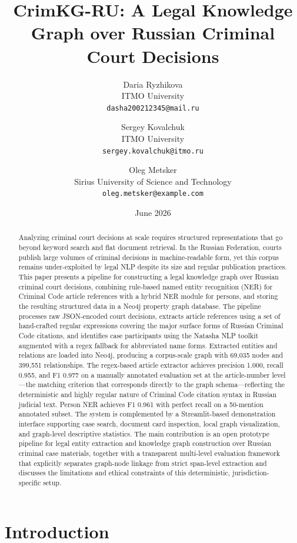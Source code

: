 \documentclass[11pt]{article}
\title{CrimKG-RU: A Legal Knowledge Graph over Russian Criminal Court Decisions}
\author{
  Daria Ryzhikova \\ ITMO University \\ \texttt{dasha200212345@mail.ru}
  \and
  Sergey Kovalchuk \\ ITMO University \\ \texttt{sergey.kovalchuk@itmo.ru}
  \and
  Oleg Metsker \\ Sirius University of Science and Technology \\ \texttt{oleg.metsker@example.com}
}
\date{June 2026}
\begin{document}
\maketitle

\begin{abstract}
Analyzing criminal court decisions at scale requires structured representations that go beyond keyword search and flat document retrieval. In the Russian Federation, courts publish large volumes of criminal decisions in machine-readable form, yet this corpus remains under-exploited by legal NLP despite its size and regular publication practices. This paper presents a pipeline for constructing a legal knowledge graph over Russian criminal court decisions, combining rule-based named entity recognition (NER) for Criminal Code article references with a hybrid NER module for persons, and storing the resulting structured data in a Neo4j property graph database. The pipeline processes raw JSON-encoded court decisions, extracts article references using a set of hand-crafted regular expressions covering the major surface forms of Russian Criminal Code citations, and identifies case participants using the Natasha NLP toolkit augmented with a regex fallback for abbreviated name forms. Extracted entities and relations are loaded into Neo4j, producing a corpus-scale graph with 69{,}035 nodes and 399{,}551 relationships. The regex-based article extractor achieves precision 1.000, recall 0.955, and F1 0.977 on a manually annotated evaluation set at the article-number level—the matching criterion that corresponds directly to the graph schema—reflecting the deterministic and highly regular nature of Criminal Code citation syntax in Russian judicial text. Person NER achieves F1 0.961 with perfect recall on a 50-mention annotated subset. The system is complemented by a Streamlit-based demonstration interface supporting case search, document card inspection, local graph visualization, and graph-level descriptive statistics. The main contribution is an open prototype pipeline for legal entity extraction and knowledge graph construction over Russian criminal case materials, together with a transparent multi-level evaluation framework that explicitly separates graph-node linkage from strict span-level extraction and discusses the limitations and ethical constraints of this deterministic, jurisdiction-specific setup.
\end{abstract}

\section{Introduction}
\end{document}
